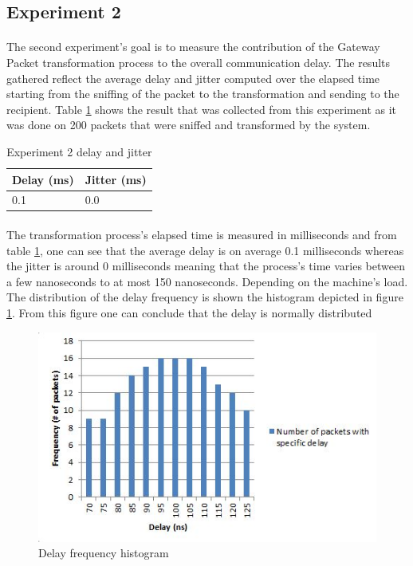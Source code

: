 \documentclass[oneside,12pt,a4paper,final]{book}
\begin{document}
\subsection{Experiment 2}
\paragraph{}
The second experiment's goal is to measure the contribution of the Gateway Packet transformation process to the overall communication delay. The results gathered reflect the average delay and jitter computed over the elapsed time starting from the sniffing of the packet to the transformation and sending to the recipient. Table \ref{table:exp2} shows the result that was collected from this experiment as it was done on 200 packets that were sniffed and transformed by the system.

\begin{table}[htbp]
    \begin{tabular}{ll}
    \hline
    Delay (ms) & Jitter (ms) \\ \hline
    0.1        & 0.0         \\ 
    \end{tabular}
    \caption{Experiment 2 delay and jitter}
        \label{table:exp2}
\end{table}
\paragraph{}
The transformation process's elapsed time is measured in milliseconds and from table \ref{table:exp2}, one can see that the average delay is on average 0.1 milliseconds whereas the jitter is around 0 milliseconds meaning that the process's time varies between a few nanoseconds to at most 150 nanoseconds. Depending on the machine's load. The distribution of the delay frequency is shown the histogram depicted in figure \ref{fig:histogram}. From this figure one can conclude that the delay is normally distributed
\begin{figure}[htbp]
 \centering
 \includegraphics[scale=0.9]{img/histogram.JPG}
 \caption{Delay frequency histogram}
 \label{fig:histogram}
 \end{figure}
\end{document}

